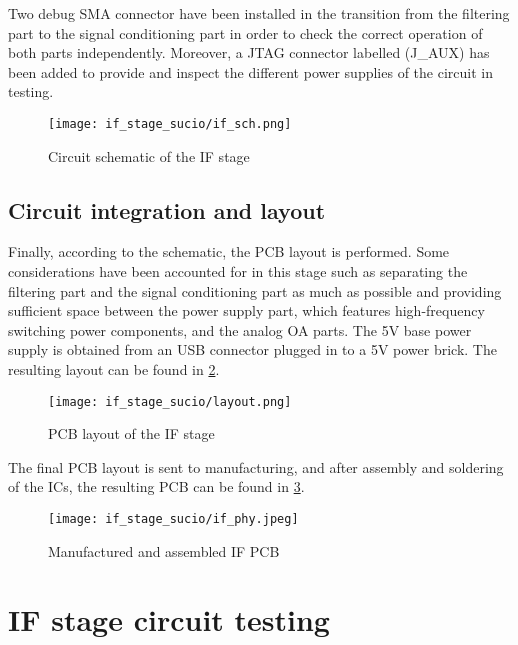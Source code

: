 Two debug SMA connector have been installed in the transition from the filtering part to the signal conditioning part in order to check the correct operation of both parts independently. Moreover, a JTAG connector labelled (J\_AUX) has been added to provide and inspect the different power supplies of the circuit in testing.
\begin{figure}[h]
	\centering
	\texttt{[image: if\_stage\_sucio/if\_sch.png]}
	\caption{Circuit schematic of the IF stage}
	\label{fig:if_sch}
\end{figure}

\subsection{Circuit integration and layout}
Finally, according to the schematic, the PCB layout is performed. Some considerations have been accounted for in this stage such as separating the filtering part and the signal conditioning part as much as possible and providing sufficient space between the power supply part, which features high-frequency switching power components, and the analog OA parts. The 5V base power supply is obtained from an USB connector plugged in to a 5V power brick. The resulting layout can be found in \cref{fig:if_layout}.

\begin{figure}[h]
	\centering
	\texttt{[image: if\_stage\_sucio/layout.png]}
	\caption{PCB layout of the IF stage}
	\label{fig:if_layout}
\end{figure}

The final PCB layout is sent to manufacturing, and after assembly and soldering of the ICs, the resulting PCB can be found in \cref{fig:if_phy}.

\begin{figure}[h]
	\centering
	\texttt{[image: if\_stage\_sucio/if\_phy.jpeg]}
	\caption{Manufactured and assembled IF PCB}
	\label{fig:if_phy}
\end{figure}

\section{IF stage circuit testing}



